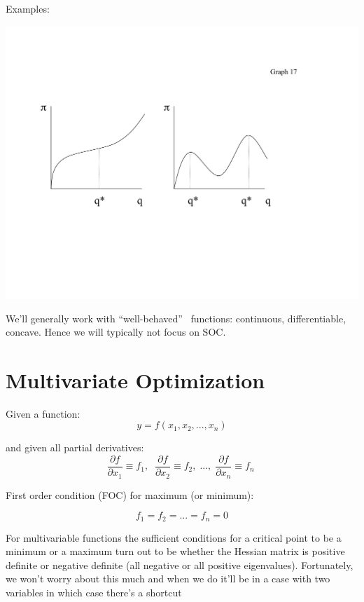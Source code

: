 \documentclass[11pt,english]{article}
\begin{document}
Examples:

\bigskip
\includegraphics[scale=0.7]{math3.pdf}


We'll generally work with ``well-behaved'' \
functions: continuous, differentiable, concave. Hence we will typically not focus on
SOC. 

\bigskip

\section{Multivariate Optimization}

Given a function: 
\begin{equation*}
y=f(x_{1},x_{2},...,x_{n})
\end{equation*}

and given all partial derivatives: 
\begin{equation*}
\frac{\partial f}{\partial x_{1}}\equiv f_{1},\;\;\frac{\partial f}{\partial
x_{2}}\equiv f_{2},\;...,\;\frac{\partial f}{\partial x_{n}}\equiv f_{n}\;
\end{equation*}

First order condition (FOC) for maximum (or minimum):

\begin{equation*}
f_{1}=f_{2}=...=f_{n}=0
\end{equation*}

For multivariable functions the sufficient conditions for a critical point to be a minimum or a maximum turn out to be whether the Hessian matrix is positive definite or negative definite (all negative or all positive eigenvalues). Fortunately, we won't worry about this much and when we do it'll be in a case with two variables in which case there's a shortcut  
\end{document}
